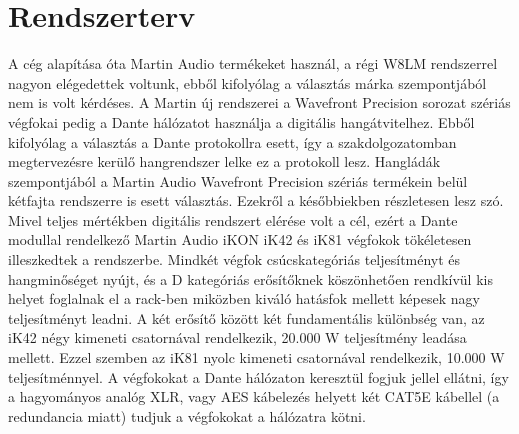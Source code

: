 \section{Rendszerterv}
A cég alapítása óta Martin Audio termékeket használ, a régi W8LM rendszerrel nagyon elégedettek voltunk, 
ebből kifolyólag a választás márka szempontjából nem is volt kérdéses. A Martin új rendszerei a Wavefront Precision sorozat szériás
végfokai pedig a Dante hálózatot használja a digitális hangátvitelhez.
Ebből kifolyólag a választás a Dante protokollra esett, így a szakdolgozatomban 
megtervezésre kerülő hangrendszer lelke ez a protokoll lesz.
Hangládák szempontjából a Martin Audio Wavefront Precision szériás termékein belül kétfajta rendszerre is esett választás.
Ezekről a későbbiekben részletesen lesz szó.
Mivel teljes mértékben digitális rendszert elérése volt a cél, ezért a Dante modullal
rendelkező Martin Audio iKON iK42 és iK81 végfokok tökéletesen illeszkedtek a rendszerbe.
Mindkét végfok csúcskategóriás teljesítményt és hangminőséget nyújt, és a D kategóriás
erősítőknek köszönhetően rendkívül kis helyet foglalnak el a rack-ben miközben kiváló hatásfok
mellett képesek nagy teljesítményt leadni. A két erősítő között két fundamentális különbség van,
az iK42 négy kimeneti csatornával rendelkezik, 20.000 W teljesítmény leadása mellett. 
Ezzel szemben az iK81 nyolc kimeneti csatornával rendelkezik, 10.000 W teljesítménnyel. \cite{IKONAMPUSEGUIDE}
A végfokokat a Dante hálózaton keresztül fogjuk jellel ellátni, így a hagyományos analóg XLR, vagy AES kábelezés helyett
két CAT5E kábellel (a redundancia miatt) tudjuk a végfokokat a hálózatra kötni. 
